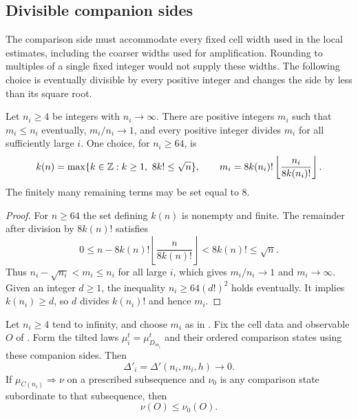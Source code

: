 \subsection{Divisible companion sides}\label{sec:companion-sequences}

The comparison side must accommodate every fixed cell width used in
the local estimates, including the coarser widths used for
amplification. Rounding to multiples of a single fixed integer would
not supply these widths. The following choice is eventually divisible
by every positive integer and changes the side by less than its square
root.

\begin{lemma}\label{lem:companions-exist}
Let $n_i\ge4$ be integers with $n_i\to\infty$. There are positive
integers $m_i$ such that $m_i\le n_i$ eventually, $m_i/n_i\to1$,
and every positive integer divides $m_i$ for all sufficiently large
$i$. One choice, for $n_i\ge64$, is
\[
 k(n)=\max\{k\in\mathbb Z:k\ge1,\ 8k!\le\sqrt n\},\qquad
 m_i=8k(n_i)!\left\lfloor\frac{n_i}{8k(n_i)!}\right\rfloor.
\]
The finitely many remaining terms may be set equal to $8$.
\end{lemma}

\begin{proof}
For $n\ge64$ the set defining $k(n)$ is nonempty and finite.
The remainder after division by $8k(n)!$ satisfies
\[
 0\le n-8k(n)!\left\lfloor\frac n{8k(n)!}\right\rfloor
       <8k(n)!\le\sqrt n.
\]
Thus $n_i-\sqrt{n_i}<m_i\le n_i$ for all large $i$, which gives
$m_i/n_i\to1$ and $m_i\to\infty$. Given an integer $d\ge1$,
the inequality $n_i\ge64(d!)^2$ holds eventually. It implies
$k(n_i)\ge d$, so $d$ divides $k(n_i)!$ and hence $m_i$.
\end{proof}

\begin{proposition}
\label{thm:comparison-any-side}
Let $n_i\ge4$ tend to infinity, and choose $m_i$ as in
. Fix the cell data and observable
$O$ of . Form the tilted laws
$\mu_i^t=\mu_{D_{m_i}}^t$ and their ordered comparison states using
these companion sides. Then
\[
 \Delta'_i=\Delta'(n_i,m_i,h)\longrightarrow0.
\]
If $\mu_{C(n_i)}\Rightarrow\nu$ on a prescribed subsequence and
$\nu_0$ is any comparison state subordinate to that subsequence,
then
\begin{equation}\label{eq:sides-limit-comparison}
 \nu(O)\le\nu_0(O).
\end{equation}
\end{proposition}

